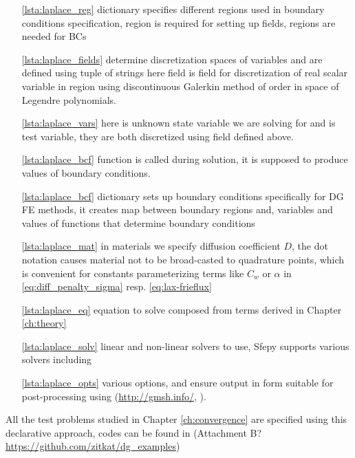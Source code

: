 \begin{itemize}
	\item[\ref{lsta:laplace_reg}]  dictionary specifies different 
	regions 
	used in	boundary conditions specification,  region is required for 
	setting up fields,  regions are needed for BCs
	\item[\ref{lsta:laplace_fields}]   determine discretization spaces of 
	variables and are defined using tuple of strings
	 here field  is field for discretization of real scalar 
	variable in region  using discontinuous Galerkin method of order 
	 in space of Legendre polynomials. 
	\item[\ref{lsta:laplace_vars}]  here  is unknown state variable we are 
	solving for and  is test variable, they are both discretized using field 
	 defined above.
	\item[\ref{lsta:laplace_bcf}]  function  is called during solution, it 
	is supposed to produce values of boundary conditions.
	\item[\ref{lsta:laplace_bcf}]  dictionary sets up boundary 
	conditions specifically for DG FE methods, it creates map between boundary regions 
	and, variables and values of functions that determine boundary conditions
	\item[\ref{lsta:laplace_mat}] in materials we specify diffusion 
	coefficient $D$, the dot notation  
	causes material not to be broad-casted to quadrature points, which is convenient for 
	constants parameterizing terms like $C_w$ or $\alpha$ in 
	\eqref{eq:diff_penalty_sigma} 
	resp. \eqref{eq:lax-frieflux}
	\item[\ref{lsta:laplace_eq}] equation to solve composed from terms derived in 
	Chapter \ref{ch:theory}
	
	\item[\ref{lsta:laplace_solv}] linear and non-linear solvers to use, Sfepy supports 
	various solvers including  \cite{MUMPS:2}
	
	\item[\ref{lsta:laplace_opts}] various options,  and 
	 ensure output in form suitable for 
	post-processing 
	using  (\url{http://gmsh.info/}, \cite{Remacle2007}).
\end{itemize}
All the test problems studied in Chapter \ref{ch:convergence} are specified using this 
declarative approach, codes can be found in (\todo Attachment B? 
\url{https://github.com/zitkat/dg_examples})

